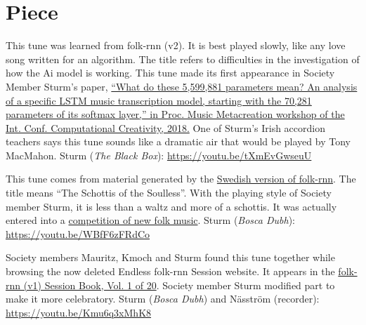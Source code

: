 \documentclass[a4paper,notitlepage,twoside]{book}
\begin{document}
\section{Piece}
{}
\hypertarget{piece:WhyAreYou}{}
This tune was learned from folk-rnn (v2). 
It is best played slowly, like any love song written for an algorithm.
The title refers to difficulties in the investigation of how the Ai model is working.
This tune made its first appearance in Society Member Sturm's paper, 
\href{http://urn.kb.se/resolve?urn=urn:nbn:se:kth:diva-238604}
{``What do these 5,599,881 parameters mean? 
An analysis of a specific LSTM music transcription model, 
starting with the 70,281 parameters of its softmax layer,” 
in Proc. Music Metacreation workshop of the Int. Conf. Computational Creativity, 2018.}
One of Sturm's Irish accordion teachers says this tune sounds like a dramatic air
that would be played by Tony MacMahon.
Sturm ({\em The Black Box}): \url{https://youtu.be/tXmEvGwseuU}

{}  
  
\hypertarget{piece:SjallosasSchottis}{}
This tune comes from material generated by the \href{https://themachinefolksession.org/tune/1012}{Swedish version of folk-rnn}.
The title means ``The Schottis of the Soulless''.
With the playing style of Society member Sturm, it is less than a waltz and more of a schottis.
It was actually entered into a \href{https://www.stallet.st/sv/latskrivartavling}{competition of new folk music}.
Sturm ({\em Bosca Dubh}): \url{https://youtu.be/WBfF6zFRdCo}

{}  
\hypertarget{piece:CuckoosWedding}{}
Society members Mauritz, Kmoch and Sturm found this tune together 
while browsing the now deleted Endless folk-rnn Session website.
It appears in the \href{https://highnoongmt.wordpress.com/2018/01/05/volumes-1-20-of-folk-rnn-v1-transcriptions}{folk-rnn (v1) Session Book, Vol. 1 of 20}.
Society member Sturm modified part to make it more celebratory.
Sturm ({\em Bosca Dubh}) and Näsström (recorder): \url{https://youtu.be/Kmu6q3xMhK8}
\end{document}
